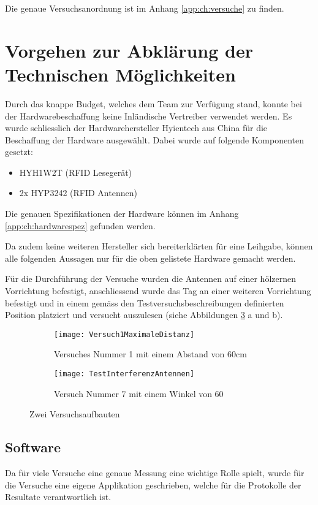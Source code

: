 Die genaue Versuchsanordnung ist im Anhang \ref{app:ch:versuche} zu finden.

\section{Vorgehen zur Abklärung der Technischen Möglichkeiten}

Durch das knappe Budget, welches dem Team zur Verfügung stand, konnte bei der Hardwarebeschaffung keine Inländische Vertreiber verwendet werden. Es wurde schliesslich der Hardwarehersteller Hyientech aus China für die Beschaffung der Hardware ausgewählt. Dabei wurde auf folgende Komponenten gesetzt:

\begin{itemize}
	\item HYH1W2T (RFID Lesegerät)
	\item 2x HYP3242 (RFID Antennen)
\end{itemize}

Die genauen Spezifikationen der Hardware können im Anhang \ref{app:ch:hardwarespez} gefunden werden.

Da zudem keine weiteren Hersteller sich bereiterklärten für eine Leihgabe, können alle folgenden Aussagen nur für die oben gelistete Hardware gemacht werden.

Für die Durchführung der Versuche wurden die Antennen auf einer hölzernen Vorrichtung befestigt, anschliessend wurde das Tag an einer weiteren Vorrichtung befestigt und in einem gemäss den Testversuchsbeschreibungen definierten Position platziert und versucht auszulesen (siehe Abbildungen \ref{fig:versuchsaufbauten} a und b).
\begin{figure}[h!]
	\begin{subfigure}{.5\linewidth}
		\texttt{[image: Versuch1MaximaleDistanz]}
		\caption{Versuches Nummer 1 mit einem Abstand von 60cm}
		\label{fig:versuchaufbaunmr1}
	\end{subfigure}\hfill%
	\begin{subfigure}{.35\linewidth}
		\centering
		\texttt{[image: TestInterferenzAntennen]}
		\caption{Versuch Nummer 7 mit einem Winkel von 60\SIUnitSymbolDegree}
		\label{fig:versuchaufbaunmr7}
	\end{subfigure}
	\caption{Zwei Versuchsaufbauten}
	\label{fig:versuchsaufbauten}
\end{figure}


\subsection{Software}
Da für viele Versuche eine genaue Messung eine wichtige Rolle spielt, wurde für die Versuche eine eigene Applikation geschrieben, welche für die Protokolle der Resultate verantwortlich ist.

